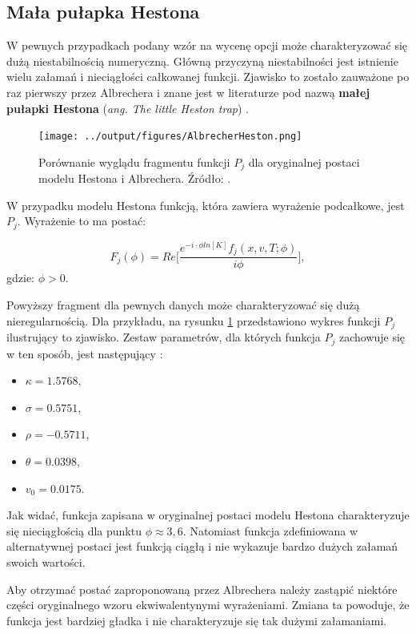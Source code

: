 \documentclass{pracamgr}
\begin{document}
\subsection{Mała pułapka Hestona} %
\label{sub:mala_pulapka_hestona}
W pewnych przypadkach podany wzór na wycenę opcji może charakteryzować się dużą niestabilnością
numeryczną. Główną przyczyną niestabilności jest istnienie wielu załamań i 
nieciągłości całkowanej funkcji. Zjawisko to zostało zauważone po raz pierwszy
przez Albrechera i znane jest w literaturze pod nazwą \textbf{małej pułapki Hestona} (\textit{ang. 
The little Heston trap}) \cite{albrecher2006little}.

\begin{figure}
\centering
  \texttt{[image: ../output/figures/AlbrecherHeston.png]}
  \caption{Porównanie wyglądu fragmentu funkcji $P_j$ dla oryginalnej 
           postaci modelu Hestona i Albrechera. Źródło: \cite{rouah2013heston}.}
  \label{fig:AlbrecherHeston}
\end{figure}
W przypadku modelu Hestona funkcją, która zawiera wyrażenie podcałkowe, jest $P_j$. 
Wyrażenie to ma postać:

\begin{equation}
\label{eq:HestonProb}
  F_j(\phi) = Re \bigg[ \frac{e^{-i \cdot \phi ln[K]} f_j(x, v, T; \phi) }{i \phi} \bigg], 
\end{equation}
gdzie: $\phi > 0$.

Powyższy fragment dla pewnych danych może charakteryzować się dużą nieregularnością. 
Dla przykładu, na rysunku \ref{fig:AlbrecherHeston} przedstawiono wykres 
funkcji $P_j$ ilustrujący to zjawisko. Zestaw parametrów, dla których funkcja $P_j$
zachowuje się w ten sposób, jest następujący \cite{rouah2013heston}:
\begin{itemize}
  \item $\kappa = 1.5768$,
  \item $\sigma = 0.5751$,
  \item $\rho = −0.5711$,
  \item $\theta = 0.0398$,
  \item $v_0 =0.0175$.
\end{itemize}

Jak widać, funkcja zapisana w oryginalnej postaci 
modelu Hestona charakteryzuje się nieciągłością dla punktu $\phi \approx 3,6$. 
Natomiast funkcja zdefiniowana w alternatywnej postaci jest funkcją ciągłą i nie wykazuje
bardzo dużych załamań swoich wartości.


Aby otrzymać postać zaproponowaną przez Albrechera należy zastąpić 
niektóre części oryginalnego wzoru ekwiwalentynymi wyrażeniami.
Zmiana ta powoduje, że funkcja jest bardziej gładka i nie charakteryzuje się tak dużymi
załamaniami.
\end{document}
